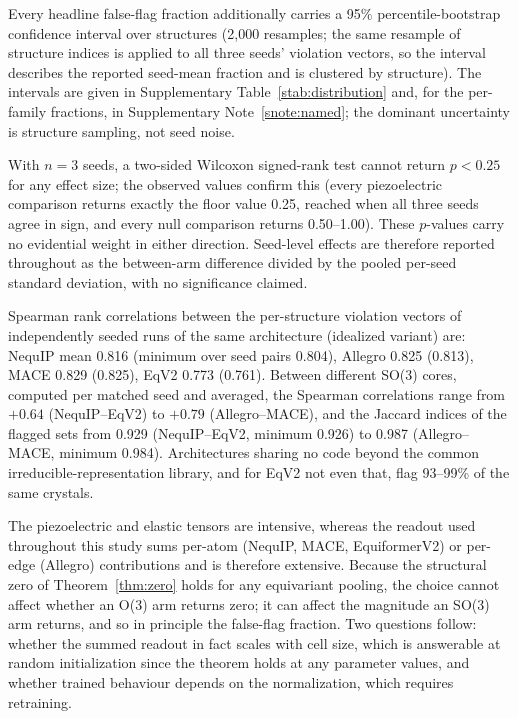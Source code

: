 Every headline false-flag fraction additionally carries a 95\% percentile-bootstrap confidence interval over structures (2,000 resamples; the same resample of structure indices is applied to all three seeds' violation vectors, so the interval describes the reported seed-mean fraction and is clustered by structure). The intervals are given in Supplementary Table~\ref{stab:distribution} and, for the per-family fractions, in Supplementary Note~\ref{snote:named}; the dominant uncertainty is structure sampling, not seed noise.

With $n = 3$ seeds, a two-sided Wilcoxon signed-rank test cannot return $p < 0.25$ for any effect size; the observed values confirm this (every piezoelectric comparison returns exactly the floor value 0.25, reached when all three seeds agree in sign, and every null comparison returns 0.50--1.00). These $p$-values carry no evidential weight in either direction. Seed-level effects are therefore reported throughout as the between-arm difference divided by the pooled per-seed standard deviation, with no significance claimed.

Spearman rank correlations between the per-structure violation vectors of independently seeded runs of the same architecture (idealized variant) are: NequIP mean 0.816 (minimum over seed pairs 0.804), Allegro 0.825 (0.813), MACE 0.829 (0.825), EqV2 0.773 (0.761). Between different SO(3) cores, computed per matched seed and averaged, the Spearman correlations range from $+0.64$ (NequIP--EqV2) to $+0.79$ (Allegro--MACE), and the Jaccard indices of the flagged sets from 0.929 (NequIP--EqV2, minimum 0.926) to 0.987 (Allegro--MACE, minimum 0.984). Architectures sharing no code beyond the common irreducible-representation library, and for EqV2 not even that, flag 93--99\% of the same crystals.


\label{snote:sizeconsistency}\label{snote:pooling}

The piezoelectric and elastic tensors are intensive, whereas the readout used throughout this study sums per-atom (NequIP, MACE, EquiformerV2) or per-edge (Allegro) contributions and is therefore extensive. Because the structural zero of Theorem~\ref{thm:zero} holds for any equivariant pooling, the choice cannot affect whether an O(3) arm returns zero; it can affect the magnitude an SO(3) arm returns, and so in principle the false-flag fraction. Two questions follow: whether the summed readout in fact scales with cell size, which is answerable at random initialization since the theorem holds at any parameter values, and whether trained behaviour depends on the normalization, which requires retraining.

